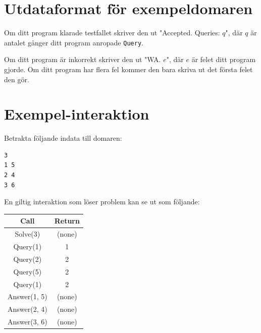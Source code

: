 \section*{Utdataformat för exempeldomaren}
Om ditt program klarade testfallet skriver den ut "Accepted. Queries: $q$", där $q$ är antalet gånger ditt program anropade \texttt{Query}.

Om ditt program är inkorrekt skriver den ut "WA. $e$", där $e$ är felet ditt program gjorde. Om ditt program har flera
fel kommer den bara skriva ut det första felet den gör.

\section*{Exempel-interaktion}

Betrakta följande indata till domaren:
\begin{verbatim}
3
1 5
2 4
3 6
\end{verbatim}

En giltig interaktion som löser problem kan se ut som följande:

\begin{table}[htbp]
  \centering
  \begin{tabular}{|c|c|}
      \hline
      \textbf{Call} & \textbf{Return} \\
      \hline
      Solve(3) & (none) \\
      \hline
      Query(1) & 1 \\
      \hline
      Query(2) & 2 \\
      \hline
      Query(5) & 2 \\
      \hline
      Query(1) & 2 \\
      \hline
      Answer(1, 5) & (none) \\
      \hline
      Answer(2, 4) & (none) \\
      \hline
      Answer(3, 6) & (none) \\
      \hline
  \end{tabular}
\end{table}



